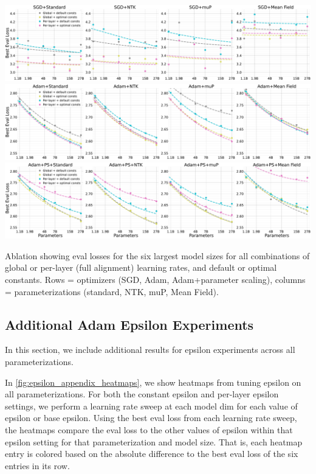 \thispagestyle{plain}
\begin{SidewaysFigure}
\includegraphics[width=\linewidth, trim={0, 0, 0, 0},clip]{icml2024/figures/per_layer_lr_appendix/sgd_ablation_appendix_grid.pdf}
\includegraphics[width=\linewidth, trim={0, 0, 0, 0},clip]{icml2024/figures/per_layer_lr_appendix/adamw_ablation_appendix_grid.pdf}
\includegraphics[width=\linewidth, trim={0, 0, 0, 0},clip]{icml2024/figures/per_layer_lr_appendix/adam_ps_ablation_appendix_grid.pdf}
\caption{Ablation showing eval losses for the six largest model sizes for all combinations of global or per-layer (full alignment) learning rates, and default or optimal constants. Rows = optimizers (SGD, Adam, Adam+parameter scaling), columns = parameterizations (standard, NTK, muP, Mean Field).}
\label{fig:app_scaling_ablation}
\end{SidewaysFigure}
\clearpage

\subsection{Additional Adam Epsilon Experiments}

In this section, we include additional results for epsilon experiments across all parameterizations.

In \cref{fig:epsilon_appendix_heatmaps}, we show heatmaps from tuning epsilon on all parameterizations. For both the constant epsilon and per-layer epsilon settings, we perform a learning rate sweep at each model dim for each value of epsilon or base epsilon. Using the best eval loss from each learning rate sweep, the heatmaps compare the eval loss to the other values of epsilon within that epsilon setting for that parameterization and model size. That is, each heatmap entry is colored based on the absolute difference to the best eval loss of the six entries in its row.

